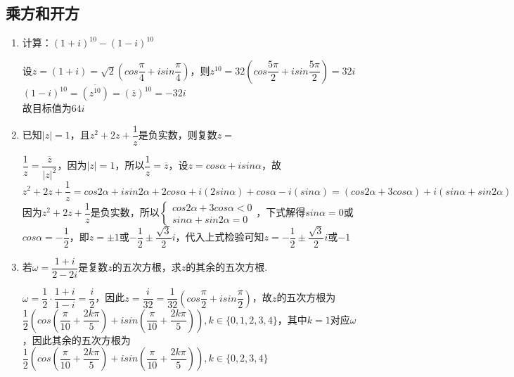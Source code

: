 \subsection*{乘方和开方}
\begin{enumerate}
    \item 计算：$(1+i)^{10}-(1-i)^{10}$
    \begin{jieda}
        设$z=(1+i) = \sqrt{2}\left(cos\dfrac{\pi}{4}+isin\dfrac{\pi}{4}\right)$，则$z^{10}=32\left(cos\dfrac{5\pi}{2}+isin\dfrac{5\pi}{2}\right) = 32i$ \\
        $(1-i)^{10} = \overline{(z^{10})} = (\overline{z})^{10} = -32i$ \\
        故目标值为$64i$
    \end{jieda}
    \item 已知$|z| = 1$，且$z^2+2z+\dfrac{1}{z}$是负实数，则复数$z = $
    \begin{jieda}
        $\dfrac{1}{z} = \dfrac{\overline{z}}{|z|^2}$，因为$|z| = 1$，所以$\dfrac{1}{z} = \overline{z}$，设$z = cos\alpha+i sin\alpha$，故$z^2+2z+\dfrac{1}{z} = cos2\alpha + i sin2\alpha + 2 cos\alpha + i(2sin\alpha) + cos\alpha - i(sin\alpha) = (cos2\alpha + 3cos\alpha) + i(sin\alpha + sin2\alpha)$ \\
        因为$z^2+2z+\dfrac{1}{z}$是负实数，所以$\left \{ \begin{array}{l}
            cos2\alpha + 3cos\alpha < 0   \\
            sin\alpha + sin2\alpha = 0  
        \end{array}\right.$，下式解得$sin\alpha = 0$或$cos\alpha = -\dfrac{1}{2}$，即$z = \pm1$或$-\dfrac{1}{2} \pm \dfrac{\sqrt{3}}{2} i$，代入上式检验可知$z = -\dfrac{1}{2} \pm \dfrac{\sqrt{3}}{2} i$或$-1$
    \end{jieda}
    \item 若$\omega = \dfrac{1+i}{2-2i}$是复数$z$的五次方根，求$z$的其余的五次方根.
    \begin{jieda}
        $\omega = \dfrac{1}{2} \cdot \dfrac{1+i}{1-i} = \dfrac{i}{2}$，因此$z = \dfrac{i}{32} = \dfrac{1}{32}\left(cos\dfrac{\pi}{2} + i sin\dfrac{\pi}{2}\right)$，故$z$的五次方根为$\dfrac{1}{2}\left(cos\left(\dfrac{\pi}{10}+\dfrac{2k\pi}{5}\right) + i sin\left(\dfrac{\pi}{10} + \dfrac{2k\pi}{5}\right)\right), k \in \{0,1,2,3,4\}$，其中$k = 1$对应$\omega$，因此其余的五次方根为$\dfrac{1}{2}\left(cos\left(\dfrac{\pi}{10}+\dfrac{2k\pi}{5}\right) + i sin\left(\dfrac{\pi}{10} + \dfrac{2k\pi}{5}\right)\right), k \in \{0,2,3,4\}$
    \end{jieda}
\end{enumerate}
